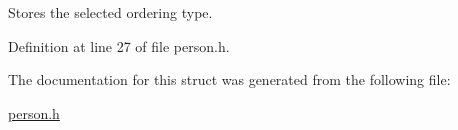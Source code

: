Stores the selected ordering type. 



Definition at line 27 of file person.\+h.



The documentation for this struct was generated from the following file\+:\begin{DoxyCompactItemize}
\item 
\hyperlink{person_8h}{person.\+h}\end{DoxyCompactItemize}
